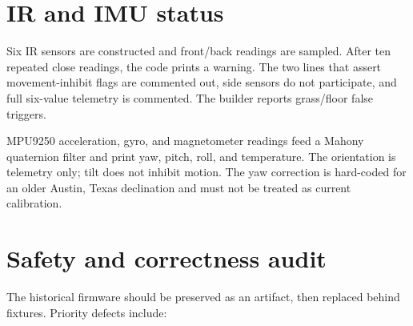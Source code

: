 \documentclass[10pt,openany]{book}
\begin{document}
\section{IR and IMU status}

\Experimental\quad Six IR sensors are constructed and front/back readings are sampled. After ten repeated close readings, the code prints a warning. The two lines that assert movement-inhibit flags are commented out, side sensors do not participate, and full six-value telemetry is commented. The builder reports grass/floor false triggers.\par

\Implemented\quad MPU9250 acceleration, gyro, and magnetometer readings feed a Mahony quaternion filter and print yaw, pitch, roll, and temperature. The orientation is telemetry only; tilt does not inhibit motion. The yaw correction is hard-coded for an older Austin, Texas declination and must not be treated as current calibration.

\section{Safety and correctness audit}

The historical firmware should be preserved as an artifact, then replaced behind fixtures. Priority defects include:
\end{document}
